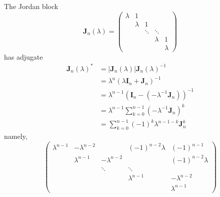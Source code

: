 \documentclass[12pt, a4paper, oneside]{book}
\begin{document}
\begin{theorem}
    The Jordan block
    \[
        \mathbf{J}_n(\lambda)
        =
        \left(
        \begin{matrix}
                \lambda & 1       &        &         &         \\
                        & \lambda & 1      &         &         \\
                        &         & \ddots & \ddots  &         \\
                        &         &        & \lambda & 1       \\
                        &         &        &         & \lambda
            \end{matrix}
        \right)
    \]
    has adjugate
    \[
        \begin{aligned}
            \mathbf{J}_n(\lambda)^* & =   \left|\mathbf{J}_n(\lambda)\right|\mathbf{J}_n(\lambda)^{-1}                        \\
                                    & =\lambda^n \left(\lambda \mathbf{I}_n + \mathbf{J}_n\right)^{-1}                        \\
                                    & = \lambda^{n-1}  \left(\mathbf{I}_n- \left(-\lambda^{-1}\mathbf{J}_n\right)\right)^{-1} \\
                                    & = \lambda^{n-1}\sum_{k=0}^{n-1} \left(-\lambda^{-1}\mathbf{J}_n\right)^k                \\
                                    & = \sum_{k=0}^{n-1} (-1)^k \lambda^{n-1-k}\mathbf{J}_n^k
        \end{aligned}
    \]
    namely,
    \renewcommand{\arraystretch}{2}
    \[
        \left(
        \begin{matrix}
                \lambda^{n-1} & -\lambda^{n-2} &                & (-1)^{n-2} \lambda & (-1)^{n-1}         \\
                              & \lambda^{n-1}  & -\lambda^{n-2} &                    & (-1)^{n-2} \lambda \\
                              &                & \ddots         & \ddots             &                    \\
                              &                &                & \lambda^{n-1}      & -\lambda^{n-2}     \\
                              &                &                &                    & \lambda^{n-1}
            \end{matrix}
        \right)
    \]
    \renewcommand{\arraystretch}{1}
\end{theorem}
\end{document}
